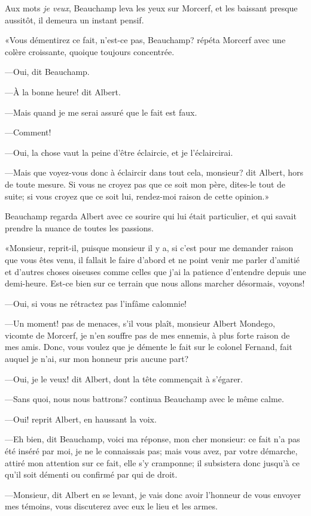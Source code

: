 Aux mots \textit{je veux}, Beauchamp leva les yeux sur Morcerf, et les baissant presque aussitôt, il demeura un instant pensif. 

«Vous démentirez ce fait, n'est-ce pas, Beauchamp? répéta Morcerf avec une colère croissante, quoique toujours concentrée. 

—Oui, dit Beauchamp. 

—À la bonne heure! dit Albert. 

—Mais quand je me serai assuré que le fait est faux. 

—Comment! 

—Oui, la chose vaut la peine d'être éclaircie, et je l'éclaircirai. 

—Mais que voyez-vous donc à éclaircir dans tout cela, monsieur? dit Albert, hors de toute mesure. Si vous ne croyez pas que ce soit mon père, dites-le tout de suite; si vous croyez que ce soit lui, rendez-moi raison de cette opinion.»  

Beauchamp regarda Albert avec ce sourire qui lui était particulier, et qui savait prendre la nuance de toutes les passions. 

«Monsieur, reprit-il, puisque monsieur il y a, si c'est pour me demander raison que vous êtes venu, il fallait le faire d'abord et ne point venir me parler d'amitié et d'autres choses oiseuses comme celles que j'ai la patience d'entendre depuis une demi-heure. Est-ce bien sur ce terrain que nous allons marcher désormais, voyons! 

—Oui, si vous ne rétractez pas l'infâme calomnie! 

—Un moment! pas de menaces, s'il vous plaît, monsieur Albert Mondego, vicomte de Morcerf, je n'en souffre pas de mes ennemis, à plus forte raison de mes amis. Donc, vous voulez que je démente le fait sur le colonel Fernand, fait auquel je n'ai, sur mon honneur pris aucune part? 

—Oui, je le veux! dit Albert, dont la tête commençait à s'égarer. 

—Sans quoi, nous nous battrons? continua Beauchamp avec le même calme. 

—Oui! reprit Albert, en haussant la voix. 

—Eh bien, dit Beauchamp, voici ma réponse, mon cher monsieur: ce fait n'a pas été inséré par moi, je ne le connaissais pas; mais vous avez, par votre démarche, attiré mon attention sur ce fait, elle s'y cramponne; il subsistera donc jusqu'à ce qu'il soit démenti ou confirmé par qui de droit.  

—Monsieur, dit Albert en se levant, je vais donc avoir l'honneur de vous envoyer mes témoins, vous discuterez avec eux le lieu et les armes. 

